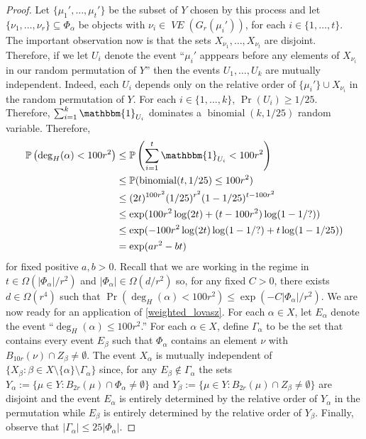 \documentclass{patmorin}
\DeclareMathOperator{\binomial}{binomial}
\DeclareMathOperator{\VE}{\mathit{VE}}
\begin{document}
\begin{proof}
  Let $\{\mu_1',\ldots,\mu_t'\}$ be the subset of $Y$ chosen by this process and let $\{\nu_1,\ldots,\nu_r\}\subseteq\Phi_\alpha$ be objects with $\nu_i\in\VE(G_r(\mu_i'))$, for each $i\in\{1,\ldots,t\}$.  The important observation now is that the sets $X_{\nu_1},\ldots,X_{\nu_t}$ are disjoint.  Therefore, if we let $U_i$ denote the event ``$\mu_i'$ apppears before any elements of $X_{\nu_i}$ in our random permutation of $Y$'' then the events $U_1,\ldots,U_k$ are mutually independent.  Indeed, each $U_i$ depends only on the relative order of $\{\mu_i'\}\cup X_{\nu_i}$ in the random permutation of $Y$.  For each $i\in\{1,\ldots,k\}$, $\Pr(U_i)\ge 1/25$.  Therefore, $\sum_{i=1}^k \mathbbm{1}_{U_i}$ dominates a $\binomial(k,1/25)$ random variable.  Therefore,
  \begin{align*}
    \Pr\left(\deg_H(\alpha)< 100r^2\right)
    & \le \Pr\left(\sum_{i=1}^t \mathbbm{1}_{U_i} < 100r^2\right) \\
    & \le \Pr(\binomial(t,1/25)\le 100r^2) \\
    & \le (2t)^{100r^2}(1/25)^{r^2}(1-1/25)^{t-100r^2} \\
    & \le \exp(100r^2\log(2t)+(t-100r^2)\log(1-1/?)) \\
    & \le \exp(-100r^2\log(2t)\log(1-1/?) + t\log(1-1/25)) \\
    & = \exp(ar^2 - bt)
  \end{align*}
  for fixed positive $a,b>0$.  Recall that we are working in the regime in  $t\in\Omega(|\Phi_\alpha|/r^2)$ and $|\Phi_\alpha|\in\Omega(d/r^2)$ so, for any fixed $C>0$, there exists $d\in\Omega(r^4)$ such that
  $\Pr(\deg_H(\alpha)< 100r^2)\le \exp(-C|\Phi_\alpha|/r^2)$.
  We are now ready for an application of \cref{weighted_lovasz}.  For each $\alpha\in X$, let $E_\alpha$ denote the event ``$\deg_H(\alpha)\le 100r^2$.''  For each $\alpha\in X$, define $\Gamma_\alpha$ to be the set that contains every event $E_\beta$ such that $\Phi_\alpha$ contains an element $\nu$ with $B_{10r}(\nu)\cap Z_\beta\neq\emptyset$.  The event $X_\alpha$ is mutually independent of $\{X_\beta:\beta\in X\setminus\{\alpha\}\setminus\Gamma_\alpha\}$ since, for any $E_\beta\not\in \Gamma_\alpha$ the sets $Y_\alpha:=\{\mu\in Y:B_{2r}(\mu)\cap \Phi_\alpha\neq\emptyset\}$ and $Y_\beta:=\{\mu\in Y:B_{2r}(\mu)\cap Z_\beta\neq\emptyset\}$ are disjoint and the event $E_\alpha$ is entirely determined by the relative order of $Y_\alpha$ in the permutation while $E_\beta$ is entirely determined by the relative order of $Y_\beta$.   Finally, observe that $|\Gamma_\alpha|\le 25|\Phi_\alpha|$.


\end{proof}
\end{document}
